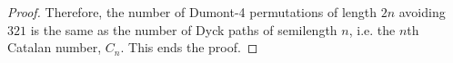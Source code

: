 \documentclass[
final
]{dmtcs-episciences}
\theoremstyle{definition}
\theoremstyle{remark}
\begin{document}
\begin{proof}
%
%
%
%
%
%

Therefore, the number of Dumont-4 permutations of length $2n$ avoiding $321$ is the same as the number of Dyck paths of semilength $n$, i.e. the $n$th Catalan number, $C_n$.  This ends the proof.
\end{proof}




\end{document}
